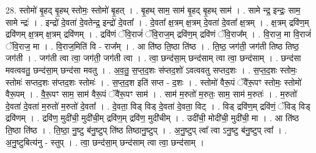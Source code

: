 \documentclass[17pt]{extarticle}
\begin{document}
28. स्तोमो॑ बृ॒हद् बृ॒हथ् स्तोमः॒ स्तोमो॑ बृ॒हत् । . बृ॒हथ् साम॒ साम॑ बृ॒हद् बृ॒हथ् साम॑ । . सामे न्द्र॒ इन्द्रः॒ साम॒ सामे न्द्रः॑ । . इन्द्रो॑ दे॒वता॑ दे॒वतेन्द्र॒ इन्द्रो॑ दे॒वता᳚ । . दे॒वता᳚ क्ष॒त्रम् क्ष॒त्रम् दे॒वता॑ दे॒वता᳚ क्ष॒त्रम् । . क्ष॒त्रम् द्रवि॑ण॒म् द्रवि॑णम् क्ष॒त्रम् क्ष॒त्रम् द्रवि॑णम् । . द्रवि॑णं ॅवि॒राजं॑ ॅवि॒राज॒म् द्रवि॑ण॒म् द्रवि॑णं ॅवि॒राज᳚म् । . वि॒राज॒ मा वि॒राजं॑ ॅवि॒राज॒ मा । . वि॒राज॒मिति॑ वि - राज᳚म् । . आ ति॑ष्ठ ति॒ष्ठा ति॑ष्ठ । . ति॒ष्ठ॒ जग॑ती॒ जग॑ती तिष्ठ तिष्ठ॒ जग॑ती । . जग॑ती त्वा त्वा॒ जग॑ती॒ जग॑ती त्वा । . त्वा॒ छन्द॑सा॒म् छन्द॑साम् त्वा त्वा॒ छन्द॑साम् । . छन्द॑सा मवत्ववतु॒ छन्द॑सा॒म् छन्द॑सा मवतु । . अ॒व॒तु॒ स॒प्त॒द॒शः स॑प्तद॒शो॑ ऽवत्ववतु सप्तद॒शः । . स॒प्त॒द॒शः स्तोमः॒ स्तोमः॑ सप्तद॒शः स॑प्तद॒शः स्तोमः॑ । . स॒प्त॒द॒श इति॑ सप्त - द॒शः । . स्तोमो॑ वैरू॒पं ॅवै॑रू॒पꣳ स्तोमः॒ स्तोमो॑ वैरू॒पम् । . वै॒रू॒पꣳ साम॒ साम॑ वैरू॒पं ॅवै॑रू॒पꣳ साम॑ । . साम॑ म॒रुतो॑ म॒रुतः॒ साम॒ साम॑ म॒रुतः॑ । . म॒रुतो॑ दे॒वता॑ दे॒वता॑ म॒रुतो॑ म॒रुतो॑ दे॒वता᳚ । . दे॒वता॒ विड् विड् दे॒वता॑ दे॒वता॒ विट् । . विड् द्रवि॑ण॒म् द्रवि॑णं॒ ॅविड् विड् द्रवि॑णम् । . द्रवि॑ण॒ मुदी॑ची॒ मुदी॑ची॒म् द्रवि॑ण॒म् द्रवि॑ण॒ मुदी॑चीम् । . उदी॑ची॒ मोदी॑ची॒ मुदी॑ची॒ मा । . आ ति॑ष्ठ ति॒ष्ठा ति॑ष्ठ । . ति॒ष्ठा॒ नु॒ष्टु ब॑नु॒ष्टुप् ति॑ष्ठ तिष्ठानु॒ष्टुप् । . अ॒नु॒ष्टुप् त्वा᳚ त्वा ऽनु॒ष्टु ब॑नु॒ष्टुप् त्वा᳚ । . अ॒नु॒ष्टुबित्य॑नु - स्तुप् । . त्वा॒ छन्द॑सा॒म् छन्द॑साम् त्वा त्वा॒ छन्द॑साम् । \newline
\end{document}
